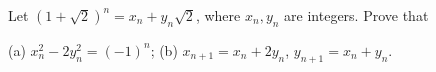 Let $(1 + \sqrt{2})^n = x_n + y_n\sqrt{2}$, where $x_n, y_n$ are integers. Prove that

(a) $x_n^2 - 2y_n^2 = (-1)^n$; (b) $x_{n+1} = x_n + 2y_n$, $y_{n+1} = x_n + y_n$.
